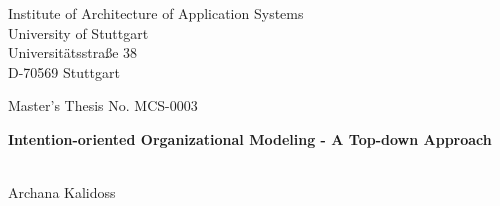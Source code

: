 \documentclass[
               fontsize=12pt, %
               paper=a4,
               twoside, %
               BCOR=3mm, %
               DIV=13,   %
               headinclude=true,
               footinclude=false,
               bibliography=totoc,
               headsepline,
               cleardoublepage=empty,
               parskip=half,
               pointlessnumbers, %
               final   %
               ]{scrbook}
\begin{document}
\pagestyle{plain}
\begin{titlepage}
	\begin{sffamily}
		\begin{center}
			Institute of Architecture of Application Systems\\
			University of Stuttgart\\
			Universitätsstraße 38\\
			D-70569 Stuttgart\\
		\end{center}
		
		\vspace{3.5cm}
		
		\begin{center}
			{Master's Thesis No. MCS-0003 }\\
			\vspace{0.5cm}
			\begin{minipage}{8.5cm}
				\begin{center}
					
					\Large \textbf{Intention-oriented Organizational Modeling - A Top-down Approach}
					
				\end{center}
			\end{minipage}
			\\
			\vspace{1cm}
			{Archana Kalidoss}
		\end{center}
		
		\vspace{1.0cm}
		

\end{sffamily}
\end{titlepage}
\end{document}
